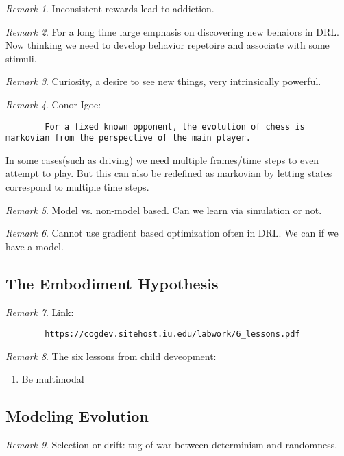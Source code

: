 \documentclass[11pt]{article}
\theoremstyle{remark}
\newtheorem{remark}{Remark}
\begin{document}
\begin{remark}
	Inconsistent rewards lead to addiction.
\end{remark}

\begin{remark}
	For a long time large emphasis on discovering new behaiors in DRL. Now thinking we need to develop behavior repetoire and associate with some stimuli.
\end{remark}

\begin{remark}
	Curiosity, a desire to see new things, very intrinsically powerful.
\end{remark}

\begin{remark}
	Conor Igoe: 
	\begin{verbatim}
		For a fixed known opponent, the evolution of chess is markovian from the perspective of the main player.
	\end{verbatim}

	In some cases(such as driving) we need multiple frames/time steps to even attempt to play. But this can also be redefined as markovian by letting states correspond to multiple time steps.
\end{remark}

\begin{remark}
	Model vs. non-model based. Can we learn via simulation or not.
\end{remark}

\begin{remark}
	Cannot use gradient based optimization often in DRL. We can if we have a model.
\end{remark}

\subsection{The Embodiment Hypothesis}

\begin{remark}
	Link:
	\begin{verbatim}
		https://cogdev.sitehost.iu.edu/labwork/6_lessons.pdf
	\end{verbatim}
\end{remark}

\begin{remark}
	The six lessons from child deveopment:
	\begin{enumerate}
		\item Be multimodal
	\end{enumerate}
\end{remark}


\subsection{Modeling Evolution}

\begin{remark}
	Selection or drift: tug of war between determinism and randomness.
\end{remark}
\end{document}
